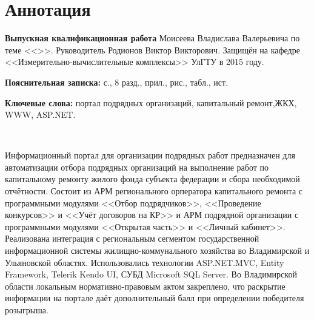 
\section*{Аннотация}

\textbf{Выпускная квалификационная работа} Моисеева Владислава Валерьевича по теме <<\WorkName>>. Руководитель Родионов Виктор Викторович. Защищён на кафедре <<Измерительно-вычислительные комплексы>> УлГТУ в 2015 году.

\textbf{Пояснительная записка:}  с., 8 разд.,  прил.,  рис.,  табл.,  ист.

\textbf{Ключевые слова:} портал подрядных организаций, капитальный ремонт,\linebreak ЖКХ, WWW, ASP.NET. 

~

Информационный портал для организации подрядных работ предназначен для автоматизации отбора подрядных организаций на выполнение работ по капитальному ремонту жилого фонда субъекта федерации и сбора необходимой отчётности.
Состоит из АРМ регионального орператора капитального ремонта с программными модулями <<Отбор подрядчиков>>, <<Проведение конкурсов>> и <<Учёт договоров на КР>> и АРМ подрядной организации с программными модулями <<Открытая часть>> и <<Личный кабинет>>.
Реализована интеграция с региональным сегментом государственной информационной системы жилищно-коммунального хозяйства во Владимирской и Ульяновской областях.
Использовались технологии \linebreak ASP.NET.MVC, Entity Framework, Telerik Kendo UI, СУБД Microsoft SQL Server.
Во Владимирской области локальным нормативно-правовым актом закреплено, что раскрытие информации на портале даёт дополнительный балл при определении победителя розыгрыша. 

\clearpage
\newpage